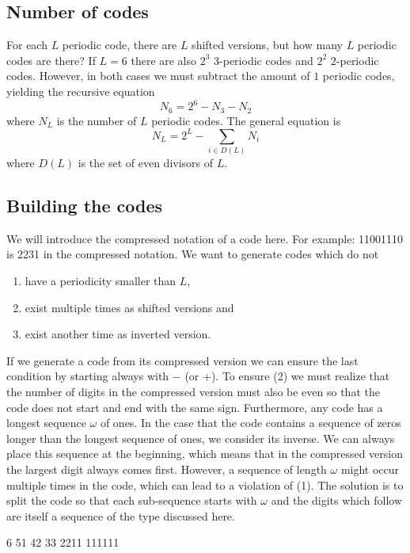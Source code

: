 \documentclass[18pt,a4paper]{extarticle}
\begin{document}
\subsection{Number of codes}
For each $L$ periodic code, there are $L$ shifted versions, but how many $L$ periodic codes are there?
If $L=6$ there are also $2^3$ $3$-periodic codes and $2^2$ $2$-periodic codes.
However, in both cases we must subtract the amount of $1$ periodic codes, yielding the recursive equation
\begin{equation}
N_6 = 2^6 - N_3 - N_2
\end{equation}
where $N_L$ is the number of $L$ periodic codes.
The general equation is
\begin{equation}
N_L = 2^L - \sum_{i \in D(L)} N_i
\end{equation}
where $D(L)$ is the set of even divisors of $L$.

\subsection{Building the codes}
We will introduce the compressed notation of a code here.
For example: 11001110 is 2231 in the compressed notation.
We want to generate codes which do not
\begin{enumerate}
	\item have a periodicity smaller than $L$,
	\item exist multiple times as shifted versions and
	\item exist another time as inverted version.
\end{enumerate}
If we generate a code from its compressed version we can ensure the last condition by starting always with $-$ (or $+$).
To ensure (2) we must realize that the number of digits in the compressed version must also be even so that the code does not start and end with the same sign.
Furthermore, any code has a longest sequence $\omega$ of ones.
In the case that the code contains a sequence of zeros longer than the longest sequence of ones, we consider its inverse.
We can always place this sequence at the beginning, which means that in the compressed version the largest digit always comes first.
However, a sequence of length $\omega$ might occur multiple times in the code, which can lead to a violation of (1).
The solution is to split the code so that each sub-sequence starts with $\omega$ and the digits which follow are itself a sequence of the type discussed here.

6
51
42
33
2211
111111
\end{document}
